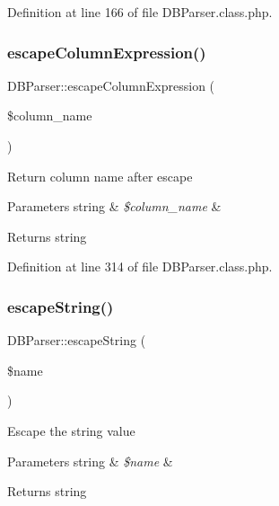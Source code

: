Definition at line 166 of file D\+B\+Parser.\+class.\+php.

\mbox{\label{classDBParser_a98416a358e6b2647d03d967b28a11504}} 
\subsubsection{\texorpdfstring{escape\+Column\+Expression()}{escapeColumnExpression()}}
{\footnotesize\ttfamily D\+B\+Parser\+::escape\+Column\+Expression (\begin{DoxyParamCaption}\item[{}]{\$column\+\_\+name }\end{DoxyParamCaption})}

Return column name after escape 
\begin{DoxyParams}[1]{Parameters}
string & {\em \$column\+\_\+name} & \\
\hline
\end{DoxyParams}
\begin{DoxyReturn}{Returns}
string 
\end{DoxyReturn}


Definition at line 314 of file D\+B\+Parser.\+class.\+php.

\mbox{\label{classDBParser_acf60e21d6407197af743d97bc9158325}} 
\subsubsection{\texorpdfstring{escape\+String()}{escapeString()}}
{\footnotesize\ttfamily D\+B\+Parser\+::escape\+String (\begin{DoxyParamCaption}\item[{}]{\$name }\end{DoxyParamCaption})}

Escape the string value


\begin{DoxyParams}[1]{Parameters}
string & {\em \$name} & \\
\hline
\end{DoxyParams}
\begin{DoxyReturn}{Returns}
string 
\end{DoxyReturn}


